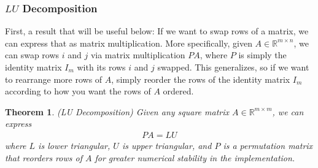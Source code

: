 \documentclass[12pt]{article}
\numberwithin{equation}{section} %
\theoremstyle{plain}
\newtheorem{thm}{Theorem}[section]
\theoremstyle{definition}
\theoremstyle{remark}
\newcommand{\R}{\mathbb{R}}
\newcommand{\Rmm}{\mathbb{R}^{m\times m}}
\begin{document}
\subsubsection{$LU$ Decomposition}

First, a result that will be useful below: If we want to swap rows of a
matrix, we can express that as matrix multiplication. More specifically,
given $A\in\R^{m\times n}$, we can swap rows $i$ and $j$ via
matrix multiplication $PA$, where $P$ is simply the identity matrix
$I_m$ with its rows $i$ and $j$ swapped. This generalizes, so if
we want to rearrange more rows of $A$, simply reorder the rows of the
identity matrix $I_m$ according to how you want the rows of $A$ ordered.

\begin{thm}\emph{(LU Decomposition)}
Given any square matrix $A\in\Rmm$, we can express
\begin{align}
  PA = LU
  \label{ludecomp}
\end{align}
where $L$ is lower triangular, $U$ is upper triangular, and $P$ is a
permutation matrix that reorders rows of $A$ for greater numerical
stability in the implementation.
\end{thm}
\end{document}
